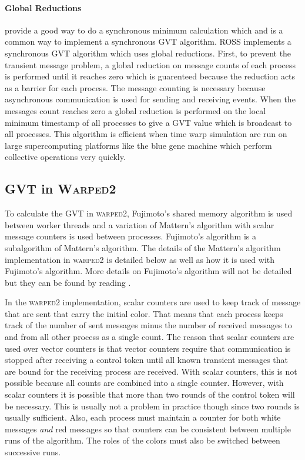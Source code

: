 \documentclass[11pt]{book}
\begin{document}
\paragraph{Global Reductions} provide a good way to do a synchronous minimum calculation
which and is a common way to implement a synchronous GVT algorithm. ROSS implements a
synchronous GVT algorithm which uses global reductions\cite{holder-08}. First, to prevent
the transient message problem, a global reduction on message counts of each process is
performed until it reaches zero which is guarenteed because the reduction acts as a barrier
for each process. The message counting is necessary because asynchronous communication is
used for sending and receiving events. When the messages count reaches zero a global
reduction is performed on the local minimum timestamp of all processes to give a GVT value
which is broadcast to all processes. This algorithm is efficient when time warp simulation
are run on large supercomputing platforms like the blue gene machine which perform collective
operations very quickly.

\subsection{GVT in \textsc{Warped2}}

To calculate the GVT in \textsc{warped2}, Fujimoto's shared memory algorithm is used between
worker threads and a variation of Mattern's algorithm with scalar message counters is used
between processes. Fujimoto's algorithm is a subalgorithm of Mattern's algorithm. The details
of the Mattern's algorithm implementation in \textsc{warped2} is detailed below as well as how
it is used with Fujimoto's algorithm. More details on Fujimoto's algorithm will not be detailed
but they can be found by reading \cite{fujimoto-94}.

In the \textsc{warped2} implementation, scalar counters are used to keep track of message
that are sent that carry the initial color. That means that each process keeps track of
the number of sent messages minus the number of received messages to and from all other
process as a single count. The reason that scalar counters are used over vector counters
is that vector counters require that communication is stopped after receiving a control token
until all known transient messages that are bound for the receiving process are received. With
scalar counters, this is not possible because all counts are combined into a single counter.
However, with scalar counters it is possible that more than two rounds of the control token will
be necessary. This is usually not a problem in practice though since two rounds is usually
sufficient. Also, each process must maintain a counter for both white messages \emph{and} red
messages so that counters can be consistent between multiple runs of the algorithm. The roles of
the colors must also be switched between successive runs.
\end{document}
